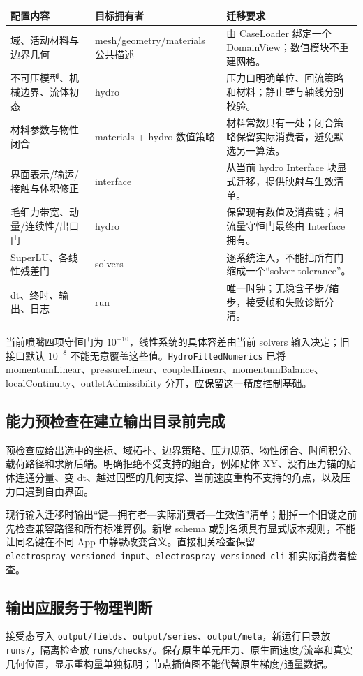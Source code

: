 \documentclass[UTF8,a4paper,11pt,fontset=fandol]{ctexart}
\newcommand{\code}[1]{\nolinkurl{#1}}
\begin{document}
\begin{longtable}{@{}P{.23\textwidth}P{.33\textwidth}P{.38\textwidth}@{}}
\toprule 配置内容 & 目标拥有者 & 迁移要求\\\midrule\endhead
域、活动材料与边界几何 & mesh/geometry/materials 公共描述 & 由 CaseLoader 绑定一个 DomainView；数值模块不重建网格。\\
不可压模型、机械边界、流体初态 & hydro & 压力口明确单位、回流策略和材料；静止壁与轴线分别校验。\\
材料参数与物性闭合 & materials + hydro 数值策略 & 材料常数只有一处；闭合策略保留实际消费者，避免默选另一算法。\\
界面表示/输运/接触与体积修正 & interface & 从当前 hydro Interface 块显式迁移，提供映射与生效清单。\\
毛细力带宽、动量/连续性/出口门 & hydro & 保留现有数值及消费链；相流量守恒门最终由 Interface 拥有。\\
SuperLU、各线性残差门 & solvers & 逐系统注入，不能把所有门缩成一个“solver tolerance”。\\
dt、终时、输出、日志 & run & 唯一时钟；无隐含子步/缩步，接受帧和失败诊断分清。\\
\bottomrule
\end{longtable}
当前喷嘴四项守恒门为 $10^{-10}$，线性系统的具体容差由当前 solvers 输入决定；旧接口默认 $10^{-8}$ 不能无意覆盖这些值。\code{HydroFittedNumerics} 已将 momentumLinear、pressureLinear、coupledLinear、momentumBalance、localContinuity、outletAdmissibility 分开，应保留这一精度控制基础。

\subsection{能力预检查在建立输出目录前完成}
预检查应给出选中的坐标、域拓扑、边界策略、压力规范、物性闭合、时间积分、载荷路径和求解后端。明确拒绝不受支持的组合，例如贴体 XY、没有压力锚的贴体连通分量、变 dt、越过固壁的几何支撑、当前速度重构不支持的角点，以及压力口遇到自由界面。

现行输入迁移时输出“键—拥有者—实际消费者—生效值”清单；删掉一个旧键之前先检查兼容路径和所有标准算例。新增 schema 或别名须具有显式版本规则，不能让同名键在不同 App 中静默改变含义。直接相关检查保留 \code{electrospray_versioned_input}、\code{electrospray_versioned_cli} 和实际消费者检查。

\subsection{输出应服务于物理判断}
接受态写入 \code{output/fields}、\code{output/series}、\code{output/meta}，新运行目录放 \code{runs/}，隔离检查放 \code{runs/checks/}。保存原生单元压力、原生面速度/流率和真实几何位置，显示重构量单独标明；节点插值图不能代替原生梯度/通量数据。
\end{document}
